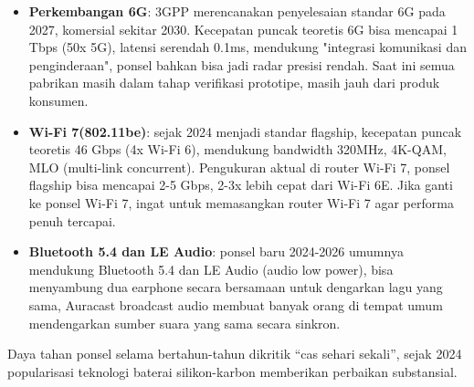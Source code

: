 \begin{itemize}
  \item \textbf{Perkembangan 6G}: 3GPP merencanakan penyelesaian standar 6G pada 2027, komersial sekitar 2030. Kecepatan puncak teoretis 6G bisa mencapai 1 Tbps (50x 5G), latensi serendah 0.1ms, mendukung "integrasi komunikasi dan penginderaan", ponsel bahkan bisa jadi radar presisi rendah. Saat ini semua pabrikan masih dalam tahap verifikasi prototipe, masih jauh dari produk konsumen.
  \item \textbf{Wi-Fi 7(802.11be)}: sejak 2024 menjadi standar flagship, kecepatan puncak teoretis 46 Gbps (4x Wi-Fi 6), mendukung bandwidth 320MHz, 4K-QAM, MLO (multi-link concurrent). Pengukuran aktual di router Wi-Fi 7, ponsel flagship bisa mencapai 2-5 Gbps, 2-3x lebih cepat dari Wi-Fi 6E. Jika ganti ke ponsel Wi-Fi 7, ingat untuk memasangkan router Wi-Fi 7 agar performa penuh tercapai.
  \item \textbf{Bluetooth 5.4 dan LE Audio}: ponsel baru 2024-2026 umumnya mendukung Bluetooth 5.4 dan LE Audio (audio low power), bisa menyambung dua earphone secara bersamaan untuk dengarkan lagu yang sama, Auracast broadcast audio membuat banyak orang di tempat umum mendengarkan sumber suara yang sama secara sinkron.
\end{itemize}


Daya tahan ponsel selama bertahun-tahun dikritik “cas sehari sekali”, sejak 2024 popularisasi teknologi baterai silikon-karbon memberikan perbaikan substansial.

